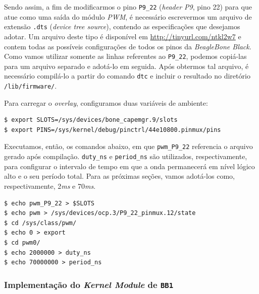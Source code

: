 Sendo assim, a fim de modificarmos o pino \texttt{P9\_22} (\textit{header P9},
pino 22) para que atue como uma saída do módulo \textit{PWM}, é necessário
escrevermos um arquivo de extensão \texttt{.dts} (\textit{device tree source}),
contendo as especificações que desejamos adotar. Um arquivo deste tipo é
disponível em \url{http://tinyurl.com/ntkl2w7} e contem todas as possíveis
configurações de todos os pinos da \textit{BeagleBone Black}. Como vamos
utilizar somente as linhas referentes ao \texttt{P9\_22}, podemos copiá-las para
um arquivo separado e adotá-lo em seguida. Após obtermos tal arquivo, é
necessário compilá-lo a partir do comando \texttt{dtc} e incluir o resultado no
diretório \texttt{/lib/firmware/}.

\vspace{12pt}

Para carregar o \textit{overlay}, configuramos duas variáveis de ambiente:

\begin{lstlisting}[keywordstyle=\ttfamily, style=nonumbers]
$ export SLOTS=/sys/devices/bone_capemgr.9/slots
$ export PINS=/sys/kernel/debug/pinctrl/44e10800.pinmux/pins
\end{lstlisting}

\vspace{12pt}

Executamos, então, os comandos abaixo, em que \texttt{pwm\_P9\_22} referencia o
arquivo gerado após compilação. \texttt{duty\_ns} e \texttt{period\_ns}
são utilizados, respectivamente, para configurar o intervalo de tempo em que a
onda permanecerá em nível lógico alto e o seu período total. Para as próximas
seções, vamos adotá-los como, respectivamente, 2\textit{ms} e 70\textit{ms}.

\begin{lstlisting}[keywordstyle=\ttfamily, style=nonumbers]
$ echo pwm_P9_22 > $SLOTS
$ echo pwm > /sys/devices/ocp.3/P9_22_pinmux.12/state
$ cd /sys/class/pwm/
$ echo 0 > export 
$ cd pwm0/
$ echo 2000000 > duty_ns
$ echo 70000000 > period_ns
\end{lstlisting}

\subsubsection{Implementação do \textit{Kernel Module} de \texttt{BB1}}
\label{sec:bb1}

